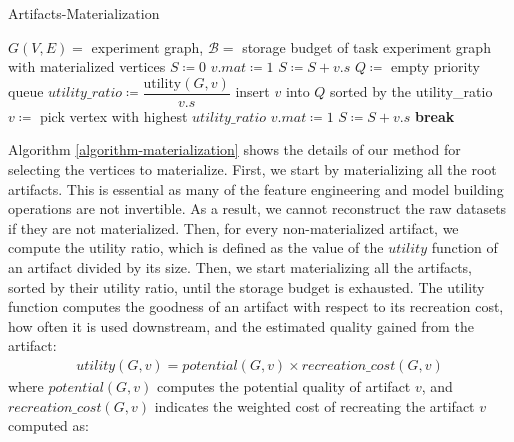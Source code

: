 \begin{algorithm}[h]
\caption{Artifacts-Materialization}\label{algorithm-materialization}
\begin{algorithmic}[1]
\Require  $G(V,E)=$ experiment graph, $\mathcal{B}=$ storage budget of task
\Ensure experiment graph with materialized vertices
\State $S \coloneqq 0$ 
 
		\State $v.mat \coloneqq 1$
		\State $S \coloneqq S + v.s$
	\EndIf
\EndFor
\State $Q \coloneqq $ empty priority queue
		\State $utility\_ratio \coloneqq \dfrac{\text{utility}(G, v)}{v.s}$
		\State insert $v$ into $Q$ sorted by the utility\_ratio
	\EndIf
\EndFor
{}
\State $v \coloneqq $ pick vertex with highest $utility\_ratio$ 
\State $v.mat \coloneqq 1$
\State $S \coloneqq S + v.s$
\Else
\State \textbf{break} 		
\EndIf
\EndWhile
\end{algorithmic}
\end{algorithm}
Algorithm \ref{algorithm-materialization} shows the details of our method for selecting the vertices to materialize.
First, we start by materializing all the root artifacts.
This is essential as many of the feature engineering and model building operations are not invertible.
As a result, we cannot reconstruct the raw datasets if they are not materialized.
Then, for every non-materialized artifact, we compute the utility ratio, which is defined as the value of the $utility$ function of an artifact divided by its size.
Then, we start materializing all the artifacts, sorted by their utility ratio, until the storage budget is exhausted.
The utility function computes the goodness of an artifact with respect to its recreation cost, how often it is used downstream, and the estimated quality gained from the artifact:
\begin{equation}
\begin{split}
utility(G,v) = 	potential(G, v) \times recreation\_cost(G,v)  
 \end{split}
\end{equation}
where $potential(G, v)$ computes the potential quality of artifact $v$, and $recreation\_cost(G,v)$ indicates the weighted cost of recreating the artifact $v$ computed as:
